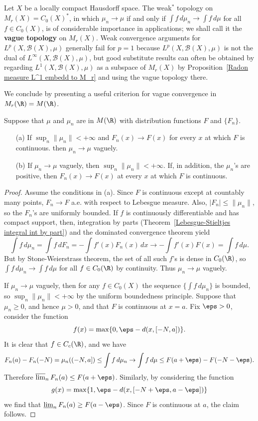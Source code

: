Let $X$ be a locally compact Hausdorff space. The weak$^*$ topology on $M_r(X)=C_0(X)^*$, in which $\mu_n\to\mu$ if and only if $\int f\,d\mu_n\to\int f\,d\mu$ for all $f\in C_0(X)$, is of considerable importance in applications; we shall call it the \textbf{vague topology} on $M_r(X)$. Weak convergence arguments for $L^p(X,\mathcal{B}(X),\mu)$ generally fail for $p=1$ because $L^p(X,\mathcal{B}(X),\mu)$ is not the dual of $L^\infty(X,\mathcal{B}(X),\mu)$, but good substitute results can often be obtained by regarding $L^1(X,\mathcal{B}(X),\mu)$ as a subspace of $M_r(X)$ by Proposition~\ref{Radon measure L^1 embedd to M_r} and using the vague topology there.\par
We conclude by presenting a useful criterion for vague convergence in $M_r(\R)=M(\R)$.
\begin{proposition}\label{vague convergence in R via distribution}
Suppose that $\mu$ and $\mu_n$ are in $M(\R)$ with distribution functions $F$ and $\{F_n\}$.
\begin{itemize}
\item[(a)] If $\sup_n\|\mu_n\|<+\infty$ and $F_n(x)\to F(x)$ for every $x$ at which $F$ is continuous. then $\mu_n\to\mu$ vaguely.
\item[(b)] If $\mu_n\to\mu$ vaguely, then $\sup_n\|\mu_n\|<+\infty$. If, in addition, the $\mu_n$'s are positive, then $F_n(x)\to F(x)$ at every $x$ at which $F$ is continuous.
\end{itemize}
\end{proposition}
\begin{proof}
Assume the conditions in (a). Since $F$ is continuous except at countably many points, $F_n\to F$ a.e. with respect to Lebesgue measure. Also, $|F_n|\leq\|\mu_n\|$, so the $F_n$'s are uniformly bounded. If $f$ is continuously differentiable and has compact support, then, integration by parts (Theorem~\ref{Lebesgue-Stieltjes integral int by part}) and the dominated convergence theorem yield
\[\int f\,d\mu_n=\int f\,dF_n=-\int f'(x)F_n(x)\,dx\to-\int f'(x)F(x)=\int f\,d\mu.\]
But by Stone-Weierstrass theorem, the set of all such $f$'s is dense in $C_0(\R)$, so $\int f\,d\mu_n\to\int f\,d\mu$ for all $f\in C_0(\R)$ by continuity. Thus $\mu_n\to\mu$ vaguely.\par
If $\mu_n\to\mu$ vaguely, then for any $f\in C_0(X)$ the sequence $\{\int f\,d\mu_n\}$ is bounded, so $\sup_n\|\mu_n\|<+\infty$ by the uniform boundedness principle. Suppose that $\mu_n\geq 0$, and hence $\mu>0$, and that $F$ is continuous at $x=a$. Fix $\eps>0$, consider the function
\[f(x)=\max\{0,\eps-d(x,[-N,a])\}.\]
It is clear that $f\in C_c(\R)$, and we have
\begin{align*}
F_n(a)-F_n(-N)=\mu_n((-N,a])\leq\int f\,d\mu_n\to \int f\,d\mu\leq F(a+\eps)-F(-N-\eps).
\end{align*}
Therefore $\varlimsup_nF_n(a)\leq F(a+\eps)$. Similarly, by considering the function
\[g(x)=\max\{1,\eps-d(x,[-N+\eps,a-\eps])\}\]
we find that $\varliminf_nF_n(a)\geq F(a-\eps)$. Since $F$ is continuous at $a$, the claim follows.
\end{proof}
